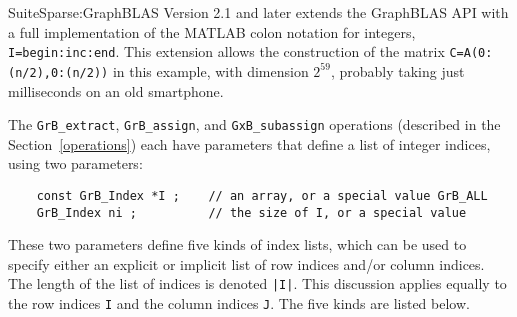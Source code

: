 \documentclass[12pt]{article}
\begin{document}
SuiteSparse:GraphBLAS Version 2.1 and later extends the GraphBLAS API with a
full implementation of the MATLAB colon notation for integers,
\verb'I=begin:inc:end'.  This extension allows the construction of the matrix
\verb'C=A(0:(n/2),0:(n/2))' in this example, with dimension $2^{59}$, probably
taking just milliseconds on an old smartphone.

The \verb'GrB_extract', \verb'GrB_assign', and \verb'GxB_subassign' operations
(described in the Section~\ref{operations}) each have parameters that define a
list of integer indices, using two parameters:

    \vspace{-0.05in}
    {\footnotesize
    \begin{verbatim}
    const GrB_Index *I ;    // an array, or a special value GrB_ALL
    GrB_Index ni ;          // the size of I, or a special value \end{verbatim}}

\vspace{-0.05in}
These two parameters define five kinds of index lists, which can be used to
specify either an explicit or implicit list of row indices and/or column
indices.  The length of the list of indices is denoted \verb'|I|'.  This
discussion applies equally to the row indices \verb'I' and the column indices
\verb'J'.  The five kinds are listed below.
\end{document}
